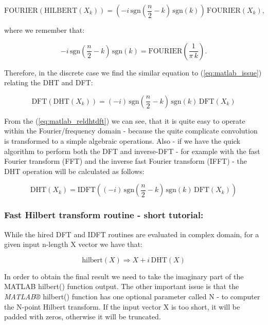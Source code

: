 \documentclass[12pt,twoside,a4paper]{article}
\numberwithin{equation}{subsection}
\numberwithin{figure}{subsection}
\begin{document}
\begin{equation} \label{eq:matlab_issue}
  \mathrm{FOURIER}(\mathrm{HILBERT}(X_k))=( - i\,\mathrm{sgn}( \frac {n}{2} - k)\,\mathrm{sgn}(k))\,\mathrm{FOURIER}({X_{k}}),
\end{equation}

where we remember that:

\begin{equation} \label{eq:matlab_kernel}
   - i\,\mathrm{sgn}(\frac {n}{2} - k)\,\mathrm{sgn}(k)=\mathrm{FOURIER}(\frac {1}{\pi \,k}) .
\end{equation}

Therefore, in the discrete case we find the similar equation to (\ref{eq:matlab_issue}) relating the DHT and DFT:

\begin{equation} \label{eq:matlab_reldhtdft}
  \mathrm{DFT}(\mathrm{DHT}({X_{k}}))=( - i)\,\mathrm{sgn}(\frac {n}{2} - k)\,\mathrm{sgn}(k)\,\mathrm{DFT}({X_{k}})
\end{equation}

From the (\ref{eq:matlab_reldhtdft}) we can see, that it is quite easy to operate within the Fourier/frequency domain - because the
quite complicate convolution is transformed to a simple algebraic operations. Also - if we have the quick algorithm to perform both
the DFT and inverse-DFT - for example with the fast Fourier transform (FFT) and the inverse fast Fourier transform (IFFT) - the DHT
operation will be calculated as follows:

\begin{equation} \label{eq:matlab_fulldhthdf}
  \mathrm{DHT}({X_{k}})=\mathrm{IDFT}(( - i)\,\mathrm{sgn}(\frac {n}{2} - k)\,\mathrm{sgn}(k)\,\mathrm{DFT}({X_{k}}))
\end{equation}

\subsubsection*{Fast Hilbert transform routine - short tutorial:}

While the hired DFT and IDFT routines are evaluated in complex domain, for a given input n-length X vector we have that:

\begin{equation} \label{eq:matlab_implication}
  \mathrm{hilbert}(X) \Rightarrow X + i\,\mathrm{DHT}(X)
\end{equation}

In order to obtain the final result we need to take the imaginary part of the MATLAB hilbert() function output. The other
important issue is that the \textit{MATLAB®} hilbert() function has one optional parameter called N - to computer the N-point
Hilbert transform. If the input vector X is too short, it will be padded with zeros, otherwise it will be truncated. 
\end{document}
